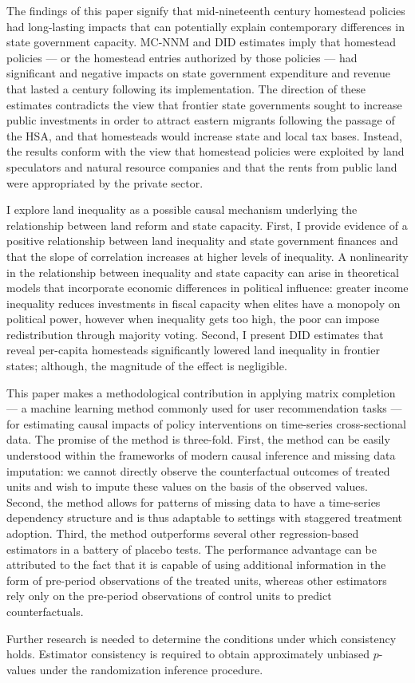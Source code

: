 The findings of this paper signify that mid-nineteenth century homestead policies had long-lasting impacts that can potentially explain contemporary differences in state government capacity. MC-NNM and DID estimates imply that homestead policies --- or the homestead entries authorized by those policies --- had significant and negative impacts on state government expenditure and revenue that lasted a century following its implementation. The direction of these estimates contradicts the view that frontier state governments sought to increase public investments in order to attract eastern migrants following the passage of the HSA, and that homesteads would increase state and local tax bases. Instead, the results conform with the view that homestead policies were exploited by land speculators and natural resource companies and that the rents from public land were appropriated by the private sector. 

I explore land inequality as a possible causal mechanism underlying the relationship between land reform and state capacity. First, I provide evidence of a positive relationship between land inequality and state government finances and that the slope of correlation increases at higher levels of inequality. A nonlinearity in the relationship between inequality and state capacity can arise in theoretical models that incorporate economic differences in political influence: greater income inequality reduces investments in fiscal capacity when elites have a monopoly on political power, however when inequality gets too high, the poor can impose redistribution through majority voting. Second, I present DID estimates that reveal per-capita homesteads significantly lowered land inequality in frontier states; although, the magnitude of the effect is negligible. 

This paper makes a methodological contribution in applying matrix completion --- a machine learning method commonly used for user recommendation tasks --- for estimating causal impacts of policy interventions on time-series cross-sectional data. The promise of the method is three-fold. First, the method can be easily understood within the frameworks of modern causal inference and missing data imputation: we cannot directly observe the counterfactual outcomes of treated units and wish to impute these values on the basis of the observed values. Second, the method allows for patterns of missing data to have a time-series dependency structure and is thus adaptable to settings with staggered treatment adoption. Third, the method outperforms several other regression-based estimators in a battery of placebo tests. The performance advantage can be attributed to the fact that it is capable of using additional information in the form of pre-period observations of the treated units, whereas other estimators rely only on the pre-period observations of control units to predict counterfactuals. 

Further research is needed to determine the conditions under which consistency holds. Estimator consistency is required to obtain approximately unbiased $p$-values under the randomization inference procedure. 